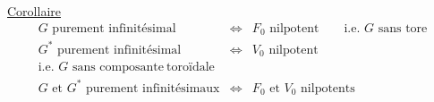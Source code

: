 \uline{Corollaire}
\[
\begin{array}{rcl}
G\text{ purement infinitésimal}&\Longleftrightarrow&F_0\text{ nilpotent}\qquad\text{i.e. }G\text{ sans tore}\\
G^*\text{ purement infinitésimal}&\Longleftrightarrow&V_0\text{ nilpotent}\\[-2pt]
\text{i.e. }G\text{ sans composante}\ \text{toroïdale}&&\\
G\text{ et }G^*\text{ purement infinitésimaux}&\Longleftrightarrow&F_0\text{ et }V_0\text{ nilpotents}
\end{array}
\]
